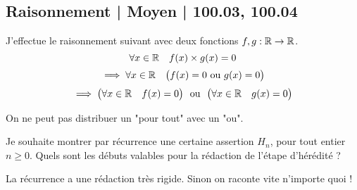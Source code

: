 \subsection{Raisonnement | Moyen | 100.03, 100.04}



\begin{question}

J'effectue le raisonnement suivant avec deux fonctions $f,g : \mathbb{R} \to \mathbb{R}$.
$$\forall x \in \mathbb{R} \quad f(x)\times g(x) = 0$$ 
$$\implies \forall x \in \mathbb{R} \quad \big(f(x) = 0 \text{ ou } g(x) = 0\big)$$
$$\implies \big(\forall x \in \mathbb{R} \quad f(x) = 0\big) \ \text{ ou } \ \big(\forall x \in \mathbb{R} \quad g(x) = 0\big)$$
\begin{answers}



\end{answers}
\begin{explanations}
On ne peut pas distribuer un "pour tout" avec un "ou". 
\end{explanations}
\end{question}


\begin{question}

Je souhaite montrer par récurrence une certaine assertion $H_n$, pour tout entier $n\ge0$.
Quels sont les débuts valables pour la rédaction de l'étape d'hérédité ?
\begin{answers}

    
    
\end{answers}
\begin{explanations}
La récurrence a une rédaction très rigide. Sinon on raconte vite n'importe quoi !
\end{explanations}
\end{question}


